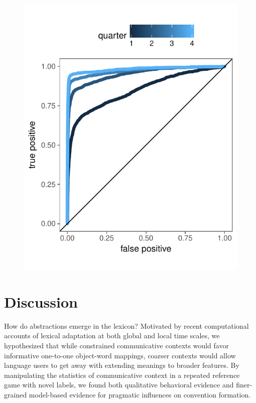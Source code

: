 \documentclass[10pt,letterpaper]{article}
\begin{document}
\begin{figure}[t]
\begin{center}
{\includegraphics[scale=0.7]{modelPerformance.pdf}}
{\caption{{\footnotesize {}  \label{fig:postTestPrediction}}}}
\end{center}
\end{figure}

\section{Discussion}

How do abstractions emerge in the lexicon? Motivated by recent computational accounts of lexical adaptation at both global and local time scales, we hypothesized that while constrained communicative contexts would favor informative one-to-one object-word mappings, coarser contexts would allow language users to get away with extending meanings to broader features. By manipulating the statistics of communicative context in a repeated reference game with novel labels, we found both qualitative behavioral evidence and finer-grained model-based evidence for pragmatic influences on convention formation.
\end{document}
